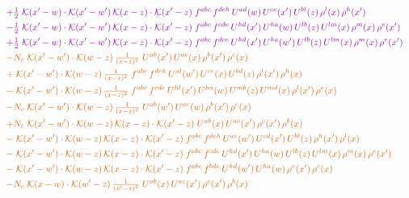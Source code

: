 \documentclass[10pt]{article}
\numberwithin{equation}{section}
\begin{document}
\begin{align}
&\quad{\color{CC}+\tfrac{1}{2}\;\mathcal{K}(x'-w)\cdot\mathcal{K}(x'-w')\,\mathcal{K}(x-z)\cdot\mathcal{K}(x'-z)\;f^{abc}\,f^{deh}\,U^{ad}(w)\,U^{ce}(x')\,U^{bl}(z)\,\rho^{l}(x)\,\rho^{h}(x')}\notag\\
&\quad{\color{CC}-\tfrac{1}{2}\;\mathcal{K}(x'-w)\cdot\mathcal{K}(x'-w')\,\mathcal{K}(x-z)\cdot\mathcal{K}(x'-z)\;f^{abc}\,f^{cde}\,U^{hd}(x')\,U^{ha}(w)\,U^{lb}(z)\,U^{lm}(x)\,\rho^{m}(x)\,\rho^{e}(x')}\notag\\
&\quad{\color{CC}+\tfrac{1}{2}\;\mathcal{K}(x'-w)\cdot\mathcal{K}(x'-w')\,\mathcal{K}(x-z)\cdot\mathcal{K}(x'-z)\;f^{abc}\,f^{dce}\,U^{hd}(x')\,U^{ha}(w')\,U^{lb}(z)\,U^{lm}(x)\,\rho^{m}(x)\,\rho^{e}(x')}\notag\\
&\quad{\color{BFK}-N_c\;\mathcal{K}(x'-w')\cdot\mathcal{K}(w-z)\,\tfrac{1}{(x-z)^{2}}\;U^{ab}(x')\,U^{ac}(x)\,\rho^{b}(x')\,\rho^{c}(x)}\notag\\
&\quad{\color{BFK}+\;\mathcal{K}(x'-w')\cdot\mathcal{K}(w-z)\,\tfrac{1}{(x-z)^{2}}\;f^{abc}\,f^{deh}\,U^{al}(w')\,U^{ce}(x)\,U^{bd}(z)\,\rho^{l}(x')\,\rho^{h}(x)}\notag\\
&\quad{\color{BFK}-\;\mathcal{K}(x'-w')\cdot\mathcal{K}(w-z)\,\tfrac{1}{(x-z)^{2}}\;f^{abc}\,f^{cde}\,U^{hl}(x')\,U^{ha}(w)\,U^{mb}(z)\,U^{md}(x)\,\rho^{l}(x')\,\rho^{e}(x)}\notag\\
&\quad{\color{BFK}-N_c\;\mathcal{K}(x'-w')\cdot\mathcal{K}(w-z)\,\tfrac{1}{(x-z)^{2}}\;U^{ab}(w')\,U^{ac}(w)\,\rho^{b}(x')\,\rho^{c}(x)}\notag\\
&\quad{\color{BFK}+N_c\;\mathcal{K}(x'-w')\cdot\mathcal{K}(w-z)\,\mathcal{K}(x-z)\cdot\mathcal{K}(x'-z)\;U^{ab}(x)\,U^{ac}(x')\,\rho^{c}(x')\,\rho^{b}(x)}\notag\\
&\quad{\color{BFK}-\;\mathcal{K}(x'-w')\cdot\mathcal{K}(w-z)\,\mathcal{K}(x-z)\cdot\mathcal{K}(x'-z)\;f^{abc}\,f^{deh}\,U^{ae}(w')\,U^{cd}(x')\,U^{bl}(z)\,\rho^{h}(x')\,\rho^{l}(x)}\notag\\
&\quad{\color{BFK}-\;\mathcal{K}(x'-w')\cdot\mathcal{K}(w-z)\,\mathcal{K}(x-z)\cdot\mathcal{K}(x'-z)\;f^{abc}\,f^{cde}\,U^{hd}(x')\,U^{ha}(w)\,U^{lb}(z)\,U^{lm}(x)\,\rho^{m}(x)\,\rho^{e}(x')}\notag\\
&\quad{\color{BFK}-\;\mathcal{K}(x'-w')\cdot\mathcal{K}(w-z)\,\mathcal{K}(x-z)\cdot\mathcal{K}(x'-z)\;f^{abc}\,f^{bde}\,U^{hd}(w')\,U^{ha}(w)\,\rho^{e}(x')\,\rho^{c}(x)}\notag\\
&\quad{\color{BFK}-N_c\;\mathcal{K}(x-w)\cdot\mathcal{K}(w'-z)\,\tfrac{1}{(x'-z)^{2}}\;U^{ab}(x)\,U^{ac}(x')\,\rho^{c}(x')\,\rho^{b}(x)}\notag\\

\end{align}
\end{document}
